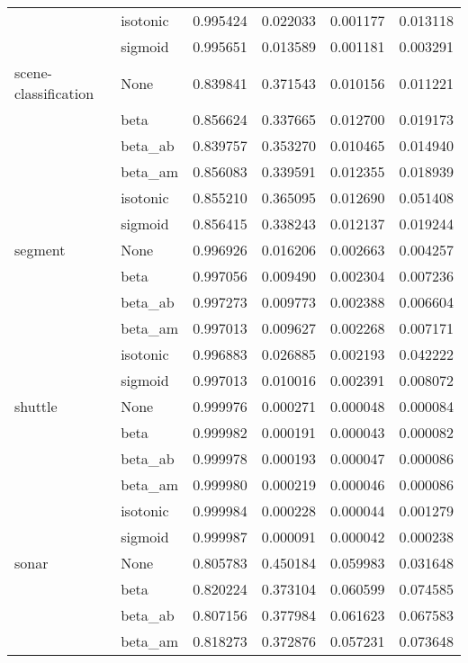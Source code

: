 \begin{tabular}{llrrrr}
        & isotonic &  0.995424 &  0.022033 &  0.001177 &  0.013118 \\
        & sigmoid &  0.995651 &  0.013589 &  0.001181 &  0.003291 \\
scene-classification & None &  0.839841 &  0.371543 &  0.010156 &  0.011221 \\
        & beta &  0.856624 &  0.337665 &  0.012700 &  0.019173 \\
        & beta\_ab &  0.839757 &  0.353270 &  0.010465 &  0.014940 \\
        & beta\_am &  0.856083 &  0.339591 &  0.012355 &  0.018939 \\
        & isotonic &  0.855210 &  0.365095 &  0.012690 &  0.051408 \\
        & sigmoid &  0.856415 &  0.338243 &  0.012137 &  0.019244 \\
segment & None &  0.996926 &  0.016206 &  0.002663 &  0.004257 \\
        & beta &  0.997056 &  0.009490 &  0.002304 &  0.007236 \\
        & beta\_ab &  0.997273 &  0.009773 &  0.002388 &  0.006604 \\
        & beta\_am &  0.997013 &  0.009627 &  0.002268 &  0.007171 \\
        & isotonic &  0.996883 &  0.026885 &  0.002193 &  0.042222 \\
        & sigmoid &  0.997013 &  0.010016 &  0.002391 &  0.008072 \\
shuttle & None &  0.999976 &  0.000271 &  0.000048 &  0.000084 \\
        & beta &  0.999982 &  0.000191 &  0.000043 &  0.000082 \\
        & beta\_ab &  0.999978 &  0.000193 &  0.000047 &  0.000086 \\
        & beta\_am &  0.999980 &  0.000219 &  0.000046 &  0.000086 \\
        & isotonic &  0.999984 &  0.000228 &  0.000044 &  0.001279 \\
        & sigmoid &  0.999987 &  0.000091 &  0.000042 &  0.000238 \\
sonar & None &  0.805783 &  0.450184 &  0.059983 &  0.031648 \\
        & beta &  0.820224 &  0.373104 &  0.060599 &  0.074585 \\
        & beta\_ab &  0.807156 &  0.377984 &  0.061623 &  0.067583 \\
        & beta\_am &  0.818273 &  0.372876 &  0.057231 &  0.073648 \\

\end{tabular}
